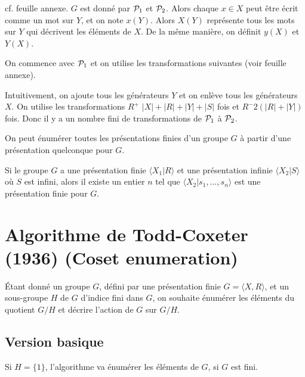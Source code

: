    \begin{preuve}
     cf. feuille annexe. $G$ est donné par ${\cal P}_1$ et ${\cal P}_2$. Alors chaque $x \in X$ peut être
     écrit comme un mot sur $Y$, et on note $x(Y)$. Alors $X(Y)$ représente tous les mots sur $Y$ qui
     décrivent les éléments de $X$. De la même manière, on définit $y(X)$ et $Y(X)$. 

     On commence avec ${\cal P}_1$ et on utilise les transformations suivantes (voir feuille annexe).

     Intuitivement, on ajoute tous les générateurs $Y$ et on enlève tous les générateurs $X$. On utilise les
     transformations $R^+$ $|X|+|R|+|Y|+|S|$ fois et $R^- 2(|R|+|Y|)$ fois. Donc il y a un nombre fini de transformations de ${\cal
       P}_1$ à ${\cal P}_2$.
   \end{preuve}

   \begin{cor}
     On peut énumérer toutes les présentations finies d'un groupe $G$ à partir d'une présentation quelconque
     pour $G$.
   \end{cor}

   \begin{prop}
     Si le groupe $G$ a une présentation finie $\langle X_1 |R \rangle$ et une présentation infinie $\langle
     X_2 | S \rangle$ où $S$ est infini, alors il existe un entier $n$ tel que $\langle X_2 | s_1, \ldots, s_n
     \rangle$ est une présentation finie pour $G$.
   \end{prop}

   \section{Algorithme de Todd-Coxeter (1936) (Coset enumeration)}
   \label{sec:algorithme-de-todd-loxeter}

   Étant donné un groupe $G$, défini par une présentation finie $G = \langle X, R \rangle$, et un sous-groupe
   $H$ de $G$ d'indice fini dans $G$, on souhaite énumérer les éléments du quotient $G/H$ et décrire l'action
   de $G$ sur $G/H$. 

   \subsection{Version basique}
   \label{sec:version-basique-todd-coxeter}

      Si $H = \{1\}$, l'algorithme va énumérer les éléments de $G$, si $G$ est fini.

